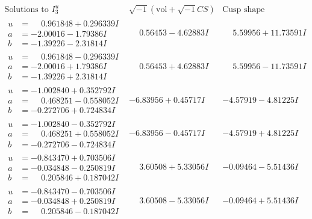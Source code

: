 \documentclass[1p]{elsarticle_modified}
\theoremstyle{definition}
\newcommand{\I}{\sqrt{-1}}
\begin{document}
$$\begin{array}{c|c|c}  
\text{Solutions to }I^u_{3}& \I (\text{vol} + \sqrt{-1}CS) & \text{Cusp shape}\\
 \hline 
\begin{aligned}
u &= \phantom{-}0.961848 + 0.296339 I \\
a &= -2.00016 - 1.79386 I \\
b &= -1.39226 - 2.31814 I\end{aligned}
 & \phantom{-}0.56453 - 4.62883 I & \phantom{-}5.59956 + 11.73591 I \\ \hline\begin{aligned}
u &= \phantom{-}0.961848 - 0.296339 I \\
a &= -2.00016 + 1.79386 I \\
b &= -1.39226 + 2.31814 I\end{aligned}
 & \phantom{-}0.56453 + 4.62883 I & \phantom{-}5.59956 - 11.73591 I \\ \hline\begin{aligned}
u &= -1.002840 + 0.352792 I \\
a &= \phantom{-}0.468251 - 0.558052 I \\
b &= -0.272706 + 0.724834 I\end{aligned}
 & -6.83956 + 0.45717 I & -4.57919 - 4.81225 I \\ \hline\begin{aligned}
u &= -1.002840 - 0.352792 I \\
a &= \phantom{-}0.468251 + 0.558052 I \\
b &= -0.272706 - 0.724834 I\end{aligned}
 & -6.83956 - 0.45717 I & -4.57919 + 4.81225 I \\ \hline\begin{aligned}
u &= -0.843470 + 0.703506 I \\
a &= -0.034848 - 0.250819 I \\
b &= \phantom{-}0.205846 + 0.187042 I\end{aligned}
 & \phantom{-}3.60508 + 5.33056 I & -0.09464 - 5.51436 I \\ \hline\begin{aligned}
u &= -0.843470 - 0.703506 I \\
a &= -0.034848 + 0.250819 I \\
b &= \phantom{-}0.205846 - 0.187042 I\end{aligned}
 & \phantom{-}3.60508 - 5.33056 I & -0.09464 + 5.51436 I \\ \hline\begin{aligned}

\end{aligned}
\end{array}$$
\end{document}
